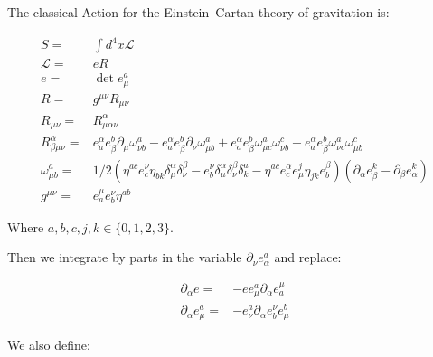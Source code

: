 \documentclass[11pt]{book}
\begin{document}
The classical Action for the Einstein--Cartan theory of gravitation is:

\begin{equation}\begin{aligned}
    S=&\int d^4 x \mathcal{L}\\
    \mathcal{L}=&e R\\
    e=&\det{e_{\mu}^{a}}\\
    R=&g^{\mu \nu} R_{\mu \nu}\\
    R_{\mu \nu}=&R^{\alpha}_{\mu \alpha \nu}\\
    R^{\alpha}_{\beta \mu \nu}=&e^{\alpha}_{a} e_{\beta}^{b}\partial_{\mu}{\omega^{a}_{\nu b}}
    -e^{\alpha}_{a} e_{\beta}^{b}\partial_{\nu}{\omega^{a}_{\mu b}}
    +e^{\alpha}_{a} e_{\beta}^{b}\omega^{a}_{\mu c}\omega^{c}_{\nu b}
    -e^{\alpha}_{a} e_{\beta}^{b}\omega^{a}_{\nu c}\omega^{c}_{\mu b}\\
    \omega^{a}_{\mu b}=&1/2 (\eta^{a c} e^{\nu}_{c} \eta_{b k}\delta_{\mu}^{\alpha}\delta_{\nu}^{\beta}-e^{\nu}_{b}\delta_{\mu}^{\alpha}\delta_{\nu}^{\beta}\delta^{a}_{k}-\eta^{a c} e^{\alpha}_{c}e_{\mu}^{j}\eta_{j k}
    e^{\beta}_{b})(\partial_{\alpha}{e_{\beta}^{k}}-\partial_{\beta}{e_{\alpha}^{k}})\\
    g^{\mu \nu}=&e^{\mu}_{a} e^{\nu}_{b} \eta^{a b}\end{aligned}\end{equation}

Where \(a, b, c, j, k\in\{0,1,2,3\}\).

Then we integrate by parts in the variable
\(\partial_{\nu}{e_{\alpha}^{a}}\) and replace:

\begin{equation}\begin{aligned}
    \partial_{\alpha}{e}=&-e e_{\mu}^{a}\partial_{\alpha}{e^{\mu}_{a}}\\
    \partial_{\alpha}{e_{\mu}^{a}}=&-e_{\nu}^{a}\partial_{\alpha}{e^{\nu}_{b}} e_{\mu}^{b}\end{aligned}\end{equation}

We also define:
\end{document}
